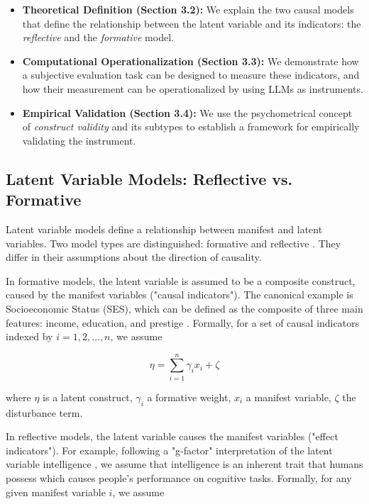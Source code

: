 \begin{itemize}
    \item \textbf{Theoretical Definition (Section 3.2):} We explain the two causal models that define the relationship between the latent variable and its indicators: the \emph{reflective} and the \emph{formative} model. 
    \item \textbf{Computational Operationalization (Section 3.3):} We demonstrate how a subjective evaluation task can be designed to measure these indicators, and how their measurement can be operationalized by using LLMs as instruments.
    \item \textbf{Empirical Validation (Section 3.4):} We use the psychometrical concept of \textit{construct validity} and its subtypes to establish a framework for empirically validating the instrument.
\end{itemize}


\subsection{Latent Variable Models: Reflective vs. Formative}

Latent variable models define a relationship between manifest and latent variables. Two model types are distinguished: formative and reflective \citep{bollen1991conventional}. They differ in their assumptions about the direction of causality. 

In formative models, the latent variable is assumed to be a composite construct, caused by the manifest variables ("causal indicators"). The canonical example is Socioeconomic Status (SES), which can be defined as the composite of three main features: income, education, and prestige \citep{mcquitty2013structural}. Formally, for a set of causal indicators indexed by $i = 1,2, \dots ,n$, we assume

\begin{equation}
    \eta = \sum_{i=1}^{n} \gamma_i x_i + \zeta
\end{equation}

where $\eta$ is a latent construct, $\gamma_i$ a formative weight, $x_i$ a manifest variable, $\zeta$ the disturbance term. 

In reflective models, the latent variable causes the manifest variables ("effect indicators"). For example, following a "g-factor" interpretation of the latent variable intelligence \citep{spearman1961general}, we assume that intelligence is an inherent trait that humans possess which causes people's performance on cognitive tasks. Formally, for any given manifest variable $i$, we assume

